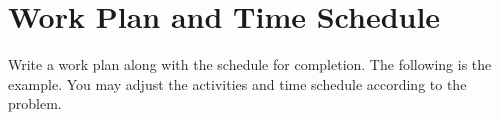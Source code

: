 \documentclass{ittelkom}
\begin{document}


\section{Work Plan and Time Schedule}
Write a work plan along with the schedule for completion. The following is the
example. You may adjust the activities and time schedule according to the
problem. \newline
\end{document}

